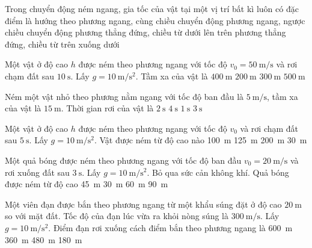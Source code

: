 \begin{ex}
	Trong chuyển động ném ngang, gia tốc của vật tại một vị trí bất kì luôn có đặc điểm là hướng theo
	\choice
	{phương ngang, cùng chiều chuyển động}
	{phương ngang, ngược chiều chuyển động}
	{phương thẳng đứng, chiều từ dưới lên trên}
	{phương thẳng đứng, chiều từ trên xuống dưới}
	\loigiai{}
\end{ex}
\begin{ex}
	Một vật ở độ cao $h$ được ném theo phương ngang với tốc độ $v_0=\SI{50}{\meter/\second}$ và rơi chạm đất sau $\SI{10}{\second}$. Lấy $g=\SI{10}{\meter/\second^2}$. Tầm xa của vật là	
	\choice
	{$\SI{400}{\meter}$}
	{$\SI{200}{\meter}$}
	{$\SI{300}{\meter}$}
	{$\SI{500}{\meter}$}
	\loigiai{}
\end{ex}
\begin{ex}
	Ném một vật nhỏ theo phương nằm ngang với tốc độ ban đầu là $\SI{5}{\meter/\second}$, tầm xa của vật là $\SI{15}{\meter}$. Thời gian rơi của vật là
	\choice
	{$\SI{2}{\second}$}
	{$\SI{4}{\second}$}
	{$\SI{1}{\second}$}
	{$\SI{3}{\second}$}
	\loigiai{}
\end{ex}
\begin{ex}
	Một vật ở độ cao $h$ được ném theo phương ngang với tốc độ $v_0$ và rơi chạm đất sau $\SI{5}{\second}$. Lấy $g=\SI{10}{\meter/\second^2}$. Vật được ném từ độ cao nào
	\choice
	{\SI{100}{\meter}}
	{\SI{125}{\meter}}
	{\SI{200}{\meter}}
	{\SI{30}{\meter}}
	\loigiai{}
\end{ex}
\begin{ex}
	Một quả bóng được ném theo phương ngang với tốc độ ban đầu $v_0=\SI{20}{\meter/\second}$ và rơi xuống đất sau $\SI{3}{\second}$. Lấy $g=\SI{10}{\meter/\second^2}$. Bỏ qua sức cản không khí. Quả bóng được ném từ độ cao
	\choice
	{\SI{45}{\meter}}
	{\SI{30}{\meter}}
	{\SI{60}{\meter}}
	{\SI{90}{\meter}}
	\loigiai{}
\end{ex}
\begin{ex}
	Một viên đạn được bắn theo phương ngang từ một khẩu súng đặt ở độ cao $\SI{20}{\meter}$ so với mặt đất. Tốc độ của đạn lúc vừa ra khỏi nòng súng là $\SI{300}{\meter/\second}$. Lấy $g=\SI{10}{\meter/\second^2}$. Điểm đạn rơi xuống cách điểm bắn theo phương ngang là
	\choice
	{\SI{600}{\meter}}
	{\SI{360}{\meter}}
	{\SI{480}{\meter}}
	{\SI{180}{\meter}}
	\loigiai{}
\end{ex}
